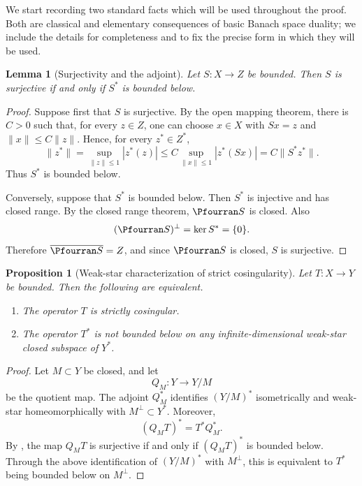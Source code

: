 \documentclass[11pt,reqno]{amsart}
\makeatletter
\theoremstyle{plain}
\newtheorem{lemma}[lemma]{Lemma}
\newtheorem{proposition}[proposition]{Proposition}
\theoremstyle{definition}
\newcounter{problempaper}
\newenvironment{problempaperbody}{%
  \setcounter{subsection}{0}%
  \setcounter{subsubsection}{0}%
  \setcounter{paragraph}{0}%
  \renewcommand{\thesubsection}{\arabic{subsection}}%
  \renewcommand{\thesubsubsection}{\thesubsection.\arabic{subsubsection}}%
  \renewcommand{\theparagraph}{\thesubsubsection.\arabic{paragraph}}%
  \let\problem@outersection\section
  \let\problem@outersubsection\subsection
  \let\problem@outersubsubsection\subsubsection
  \let\problem@outerparagraph\paragraph
  \let\section\problem@papersection
  \let\subsection\problem@papersubsection
  \let\subsubsection\problem@papersubsubsection
}{%
  \let\section\problem@outersection
  \let\subsection\problem@outersubsection
  \let\subsubsection\problem@outersubsubsection
  \let\paragraph\problem@outerparagraph
}
\newcommand{\problem@target}[2]{%
  \hypertarget{problem-\theproblempaper-#1-#2}{}%
}
\newcommand{\problem@paperheading}[3]{%
  \par\bigskip
  \problem@target{#1}{#2}%
  \noindent{\large\bfseries #2.\quad #3\par}%
  \nobreak\smallskip
}
\newcommand{\problem@papersubheading}[3]{%
  \par\medskip
  \problem@target{#1}{#2}%
  \noindent{\normalsize\bfseries #2.\quad #3\par}%
  \nobreak\smallskip
}
\newcommand{\problem@papersubsubheading}[3]{%
  \par\smallskip
  \problem@target{#1}{#2}%
  \noindent{\normalsize\itshape #2.\quad #3.\ }%
}
\def\problem@papersection{%
  \@ifstar{\problem@papersectionstar}{\problem@papersectionnostar}%
}
\def\problem@papersectionstar#1{%
  \par\bigskip\noindent{\large\bfseries #1\par}\nobreak\smallskip
}
\def\problem@papersectionnostar#1{%
  \refstepcounter{subsection}%
  \setcounter{subsubsection}{0}%
  \setcounter{paragraph}{0}%
  \problem@paperheading{section}{\thesubsection}{#1}%
  \problem@writecontentsline{section}{\thesubsection}{#1}%
}
\def\problem@papersubsection{%
  \@ifstar{\problem@papersubsectionstar}{\problem@papersubsectionnostar}%
}
\def\problem@papersubsectionstar#1{%
  \par\medskip\noindent{\normalsize\bfseries #1\par}\nobreak\smallskip
}
\def\problem@papersubsectionnostar#1{%
  \refstepcounter{subsubsection}%
  \setcounter{paragraph}{0}%
  \problem@papersubheading{subsection}{\thesubsubsection}{#1}%
  \problem@writecontentsline{subsection}{\thesubsubsection}{#1}%
}
\def\problem@papersubsubsection{%
  \@ifstar{\problem@papersubsubsectionstar}{\problem@papersubsubsectionnostar}%
}
\def\problem@papersubsubsectionstar#1{%
  \par\smallskip\noindent{\normalsize\itshape #1.\ }%
}
\def\problem@papersubsubsectionnostar#1{%
  \refstepcounter{paragraph}%
  \problem@papersubsubheading{subsubsection}{\theparagraph}{#1}%
  \problem@writecontentsline{subsubsection}{\theparagraph}{#1}%
}
\newcommand{\problem@writecontentsline}[3]{%
  \begingroup
  \protected@write\@auxout{}{%
    \string\problemcontentsentry{\theproblempaper}{#1}{#2}{#3}{\thepage}%
  }%
  \endgroup
}
\newcommand{\problemcontentsentry}[5]{%
  \@ifundefined{problemcontents@#1}{%
    \expandafter\gdef\csname problemcontents@#1\endcsname{}%
  }{}%
  \expandafter\g@addto@macro\csname problemcontents@#1\endcsname{%
    \problemcontentsline{#1}{#2}{#3}{#4}{#5}%
  }%
}
\newcommand{\problemcontentslink}[4]{%
  \hyperlink{problem-#1-#2-#3}{#4}%
}
\newcommand{\problemcontentsline}[5]{%
  \ifstrequal{#2}{section}{%
    \par\noindent
    \problemcontentslink{#1}{#2}{#3}{\makebox[2.5em][l]{#3}#4}%
    \nobreak\dotfill
    \problemcontentslink{#1}{#2}{#3}{#5}\par
  }{%
    \ifstrequal{#2}{subsection}{%
      \par\noindent\hspace*{1.5em}%
      \problemcontentslink{#1}{#2}{#3}{\makebox[3.5em][l]{#3}#4}%
      \nobreak\dotfill
      \problemcontentslink{#1}{#2}{#3}{#5}\par
    }{%
      \par\noindent\hspace*{3em}%
      \problemcontentslink{#1}{#2}{#3}{\makebox[4.5em][l]{#3}#4}%
      \nobreak\dotfill
      \problemcontentslink{#1}{#2}{#3}{#5}\par
    }%
  }%
}
\makeatother
\begin{document}
\begin{problempaperbody}
We start recording two standard facts which will be used throughout the proof. Both are classical and elementary consequences of basic Banach space duality; we include the details for completeness and to fix the precise form in which they will be used.

\begin{lemma}[Surjectivity and the adjoint]
\label{p4:lem:surjectivity-adjoint}
Let $S \colon X\to Z$ be bounded. Then $S$ is surjective if and only if $S^*$ is bounded below.
\end{lemma}

\begin{proof}
Suppose first that $S$ is surjective. By the open mapping theorem, there is $C>0$ such that, for every $z\in Z$, one can choose $x\in X$ with $Sx=z$ and $\|x\|\leq C\|z\|$. Hence, for every $z^*\in Z^*$,
\begin{equation*}
        \|z^*\|=\sup_{\|z\|\leq 1}|z^*(z)|\leq C\sup_{\|x\|\leq 1}|z^*(Sx)|=C\|S^*z^*\|.
\end{equation*}
Thus $S^*$ is bounded below.

Conversely, suppose that $S^*$ is bounded below. Then $S^*$ is injective and has closed range. By the closed range theorem, $\Pfourran S$ is closed. Also
\begin{equation*}
        (\Pfourran S)^\perp=\ker S^*=\{0\}.
\end{equation*}
Therefore $\overline{\Pfourran S}=Z$, and since $\Pfourran S$ is closed, $S$ is surjective.
\end{proof}

\begin{proposition}[Weak-star characterization of strict cosingularity]
\label{p4:prop:wstar-characterization}
Let $T \colon X\to Y$ be bounded. Then the following are equivalent.
\begin{enumerate}[label=\textup{(\roman*)}]
\item\label{p4:item:T-strictly-cosingular} The operator $T$ is strictly cosingular.
\item\label{p4:item:Tstar-no-wstar-below} The operator $T^*$ is not bounded below on any infinite-dimensional weak-star closed subspace of $Y^*$.
\end{enumerate}
\end{proposition}

\begin{proof}
Let $M\subset Y$ be closed, and let
\begin{equation*}
        Q_M \colon Y\to Y/M
\end{equation*}
be the quotient map. The adjoint $Q_M^*$ identifies $(Y/M)^*$ isometrically and weak-star homeomorphically with $M^\perp\subset Y^*$. Moreover,
\begin{equation*}
        (Q_MT)^*=T^*Q_M^*.
\end{equation*}
By , the map $Q_MT$ is surjective if and only if $(Q_MT)^*$ is bounded below. Through the above identification of $(Y/M)^*$ with $M^\perp$, this is equivalent to $T^*$ being bounded below on $M^\perp$.


\end{proof}
\end{problempaperbody}
\end{document}
